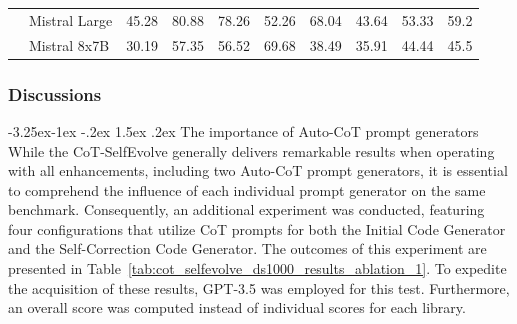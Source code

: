 \documentclass[a4paper,oneside]{book}
\makeatletter
\newcounter {subsubsubsection}[subsubsection]
\newcommand\subsubsubsection{\@startsection{subsubsubsection}{4}{\z@}%
                                    {-3.25ex\@plus -1ex \@minus -.2ex}%
                                    {1.5ex \@plus .2ex}%
                                    {\normalfont\normalsize\bfseries}}
\makeatother
\begin{document}
\begin{table}[H]
{\begin{tabular}{|l|l|c|c|c|c|c|c|c|c|}
                                      & Mistral Large & 45.28                      & 80.88                        & 78.26                        & 52.26                           & 68.04                       & 43.64                      & 53.33                           & 59.2                         \\ \cline{2-10}
                                      & Mistral 8x7B  & 30.19                      & 57.35                        & 56.52                        & 69.68                           & 38.49                       & 35.91                      & 44.44                           & 45.5                         \\ \hline
    \end{tabular}%
  }
\end{table}

\subsubsection{Discussions}
\subsubsubsection{The importance of Auto-CoT prompt generators}
While the CoT-SelfEvolve generally delivers remarkable results when operating with all enhancements, including two Auto-CoT prompt generators, it is essential to comprehend the influence of each individual prompt generator on the same benchmark. Consequently, an additional experiment was conducted, featuring four configurations that utilize CoT prompts for both the Initial Code Generator and the Self-Correction Code Generator. The outcomes of this experiment are presented in Table~\ref{tab:cot_selfevolve_ds1000_results_ablation_1}. To expedite the acquisition of these results, GPT-3.5 was employed for this test. Furthermore, an overall score was computed instead of individual scores for each library.

\begin{table}[H]
  \caption{$\text{Pass@5}$ results on the DS-1000 dataset with or without CoT prompts. (\%)}\label{tab:cot_selfevolve_ds1000_results_ablation_1}
  \centering
\end{table}
\end{document}
